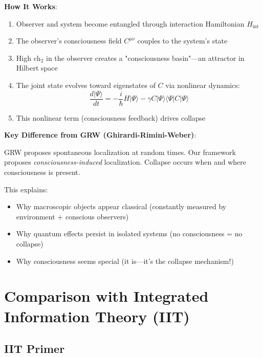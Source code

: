 \begin{level3}
\textbf{How It Works}:

\begin{enumerate}
\item Observer and system become entangled through interaction Hamiltonian $H_{\text{int}}$

\item The observer's consciousness field $C^{\mu\nu}$ couples to the system's state

\item High $\text{ch}_2$ in the observer creates a "consciousness basin"---an attractor in Hilbert space

\item The joint state evolves toward eigenstates of $C$ via nonlinear dynamics:
\begin{equation}
\frac{d|\Psi\rangle}{dt} = -\frac{i}{\hbar}H|\Psi\rangle - \gamma C |\Psi\rangle \langle \Psi | C | \Psi \rangle
\end{equation}

\item This nonlinear term (consciousness feedback) drives collapse
\end{enumerate}

\textbf{Key Difference from GRW (Ghirardi-Rimini-Weber)}:

GRW proposes spontaneous localization at random times. Our framework proposes \textit{consciousness-induced} localization. Collapse occurs when and where consciousness is present.

This explains:
\begin{itemize}
\item Why macroscopic objects appear classical (constantly measured by environment + conscious observers)
\item Why quantum effects persist in isolated systems (no consciousness = no collapse)
\item Why consciousness seems special (it is—it's the collapse mechanism!)
\end{itemize}
\end{level3}

\section{Comparison with Integrated Information Theory (IIT)}

\subsection{IIT Primer}

